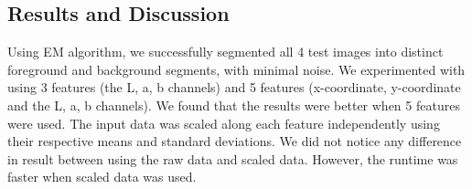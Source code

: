 \documentclass{article}
\begin{document}
    \subsection{Results and Discussion}
    Using EM algorithm, we successfully segmented all 4 test images into distinct foreground and background segments, with minimal noise. We experimented with using 3 features (the L, a, b channels) and 5 features (x-coordinate, y-coordinate and the L, a, b channels). We found that the results were better when 5 features were used. The input data was scaled along each feature independently using their respective means and standard deviations. We did not notice any difference in result between using the raw data and scaled data. However, the runtime was faster when scaled data was used.
\end{document}

